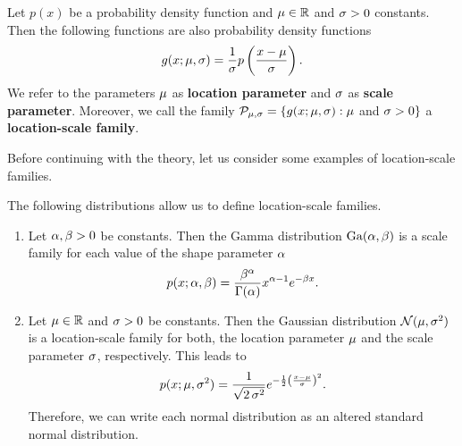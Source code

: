 \begin{theorem}\label{theorem:pdf_gen}
Let $p(x)$ be a probability density function and $\operatorname{\mu}\in\operatorname{\mathbb{R}}$ and $\operatorname{\sigma} > 0$ constants. Then the following functions are also probability density functions
\begin{align*}
g(x;\operatorname{\mu},\operatorname{\sigma}) = \frac{1}{\operatorname{\sigma}} p\left( \frac{x - \operatorname{\mu}}{\operatorname{\sigma}} \right).
\end{align*}
We refer to the parameters $\operatorname{\mu}$ as \textbf{location parameter} and $\operatorname{\sigma}$ as \textbf{scale parameter}. Moreover, we call the family $\mathcal{P}_{\operatorname{\mu},\operatorname{\sigma}} = \{g(x;\operatorname{\mu},\operatorname{\sigma}):\operatorname{\mu}$ and $\operatorname{\sigma} > 0\}$ a \textbf{location-scale family}.
\end{theorem}

Before continuing with the theory, let us consider some examples of location-scale families.

\begin{example}\label{ex:loc-scale_fam}
The following distributions allow us to define location-scale families.
\begin{enumerate}
\item Let $\alpha,\beta >0$ be constants. Then the Gamma distribution $\text{Ga}(\alpha,\beta)$ is a scale family for each value of the shape parameter $\alpha$
\begin{align*}
p(x;\alpha,\beta) = \frac{\beta^\alpha}{\Gamma(\alpha)}x^{\alpha-1} e^{-\beta x}.
\end{align*}
\item Let $\operatorname{\mu}\in\operatorname{\mathbb{R}}$ and $\operatorname{\sigma}>0$ be constants. Then the Gaussian distribution $\mathcal{N}(\operatorname{\mu},\operatorname{\sigma}^2)$ is a location-scale family for both, the location parameter $\operatorname{\mu}$ and the scale parameter $\operatorname{\sigma}$, respectively. This leads to
\begin{align*}
p(x; \operatorname{\mu}, \operatorname{\sigma}^2) = \frac{1}{\sqrt{2\operatorname{\sigma}^2}} e^{-\frac{1}{2} \left( \frac{x-\operatorname{\mu}}{\operatorname{\sigma}} \right)^2}.
\end{align*}
Therefore, we can write each normal distribution as an altered standard normal distribution.
\end{enumerate}
\end{example}


